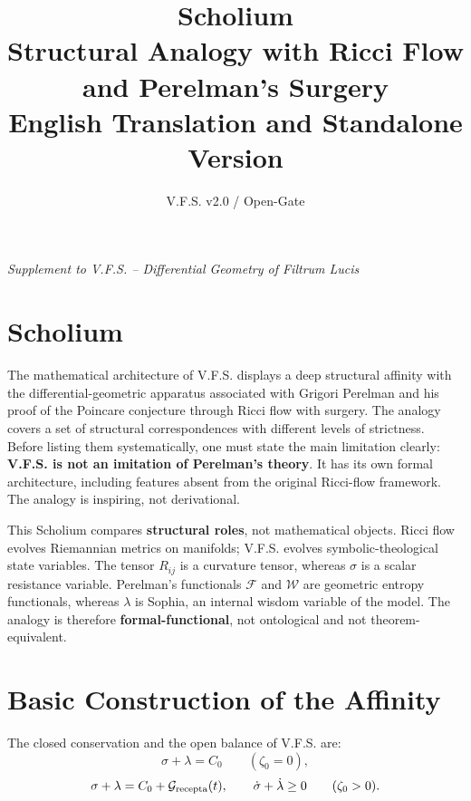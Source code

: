 \documentclass[11pt]{article}
\title{\textbf{Scholium}\\Structural Analogy with Ricci Flow and Perelman's Surgery\\\large English Translation and Standalone Version}
\author{V.F.S. v2.0 / Open-Gate}
\date{}
\newcommand{\VFS}{V.F.S.}
\newcommand{\Grec}{\mathcal{G}_{\rm recepta}}
\begin{document}
\maketitle

\begin{center}
\emph{Supplement to V.F.S. -- Differential Geometry of Filtrum Lucis}
\end{center}

\section*{Scholium}

The mathematical architecture of \VFS{} displays a deep structural affinity with the differential-geometric apparatus associated with Grigori Perelman and his proof of the Poincare conjecture through Ricci flow with surgery. The analogy covers a set of structural correspondences with different levels of strictness. Before listing them systematically, one must state the main limitation clearly: \textbf{\VFS{} is not an imitation of Perelman's theory}. It has its own formal architecture, including features absent from the original Ricci-flow framework. The analogy is inspiring, not derivational.

This Scholium compares \textbf{structural roles}, not mathematical objects. Ricci flow evolves Riemannian metrics on manifolds; \VFS{} evolves symbolic-theological state variables. The tensor $R_{ij}$ is a curvature tensor, whereas $\sigma$ is a scalar resistance variable. Perelman's functionals $\mathcal F$ and $\mathcal W$ are geometric entropy functionals, whereas $\lambda$ is Sophia, an internal wisdom variable of the model. The analogy is therefore \textbf{formal-functional}, not ontological and not theorem-equivalent.

\section{Basic Construction of the Affinity}

The closed conservation and the open balance of \VFS{} are:
\begin{equation}
\sigma+\lambda=C_0 \qquad (\zeta_0=0),
\end{equation}
\begin{equation}
\sigma+\lambda=C_0+\Grec(t), \qquad \dot\sigma+\dot\lambda\ge 0 \qquad (\zeta_0>0).
\end{equation}
\end{document}
